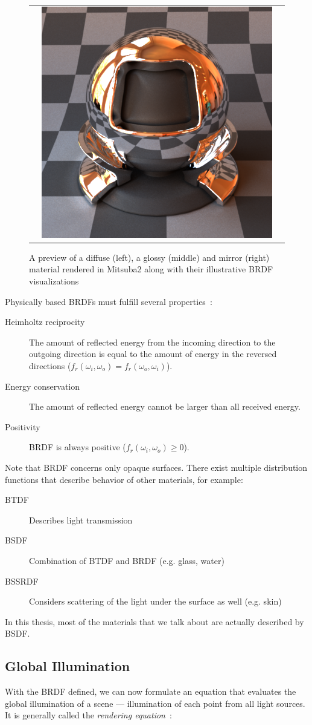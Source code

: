 \begin{figure}[httpb]
\begin{tabular}{ccc}
		&
		\includegraphics[width=.3\linewidth]{img/brdf_mirror.png}
	\end{tabular}
	\caption{A preview of a diffuse (left), a glossy (middle) and mirror (right) material rendered in Mitsuba2 along with their illustrative BRDF visualizations}
	\label{fig:compare_brdf}
\end{figure}


Physically based BRDFs must fulfill several properties~\citealp{duvenhage2013numerical}:
\begin{description}
	\item[Heimholtz reciprocity] The amount of reflected energy from the incoming direction to the outgoing direction is equal to the amount of energy in the reversed directions ($f_r(\omega_i,\omega_o)=f_r(\omega_o,\omega_i)$).
	\item[Energy conservation] The amount of reflected energy cannot be larger than all received energy.
	\item[Positivity] BRDF is always positive ($f_r(\omega_i,\omega_o)\ge0$).
\end{description}

Note that BRDF concerns only opaque surfaces. There exist multiple distribution functions that describe behavior of other materials, for example:
\begin{description}
	\item[BTDF] Describes light transmission
	\item[BSDF] Combination of BTDF and BRDF (e.g. glass, water)
	\item[BSSRDF] Considers scattering of the light under the surface as well (e.g. skin)
\end{description}

In this thesis, most of the materials that we talk about are actually described by BSDF.

\subsection{Global Illumination}

With the BRDF defined, we can now formulate an equation that evaluates the global illumination of a scene --- illumination of each point from all light sources. It is generally called the \emph{rendering equation}~\cite{kajiya1986rendering}:

